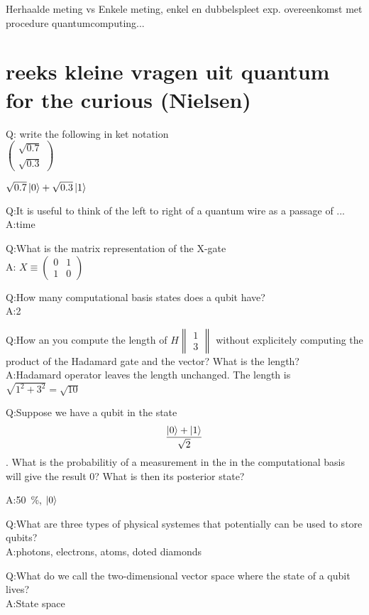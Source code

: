 \documentclass[a4paper, addpoints, 12pt
    , noanswers    %
    ]{exam}
\begin{document}
\begin{questions}
\begin{parts}
\end{parts}

\question[]
Herhaalde meting vs Enkele meting, enkel en dubbelspleet exp. overeenkomst met procedure quantumcomputing...

\section*{reeks kleine vragen uit quantum for the curious (Nielsen)}
Q: write the following in ket notation\\
$\begin{pmatrix}
\sqrt{0.7}\\
\sqrt{0.3}
\end{pmatrix}
$

$\sqrt{0.7} \ket{0}+\sqrt{0.3}\ket{1}$


Q:It is useful to think of the left to right of a quantum wire as a passage of ...
\\
A:time

Q:What is the matrix representation of the X-gate\\
A:
$X \equiv \begin{pmatrix}
0&1\\
1&0
\end{pmatrix}
$

Q:How many computational basis states does a qubit have?\\
A:2

Q:How an you compute the length of
$H\begin{Vmatrix}
1\\
3
\end{Vmatrix}
$
without explicitely computing the product of the Hadamard gate and the vector?
What is the length?\\

A:Hadamard operator leaves the length unchanged. The length is $\sqrt{1^2+3^2}=\sqrt{10}$

Q:Suppose we have a qubit in the state
$$\frac{\ket{0}+\ket{1}}{\sqrt{2}}$$. What is the probabilitiy of a measurement in the in the computational basis will give the result 0? What is then its posterior state? 

A:\SI{50}{\percent}, $\ket{0}$

Q:What are three types of physical systemes that potentially can be used to store qubits?\\

A:photons, electrons, atoms, doted diamonds

Q:What do we call the two-dimensional vector space where the state of a qubit lives?\\
A:State space


\end{questions}
\end{document}
